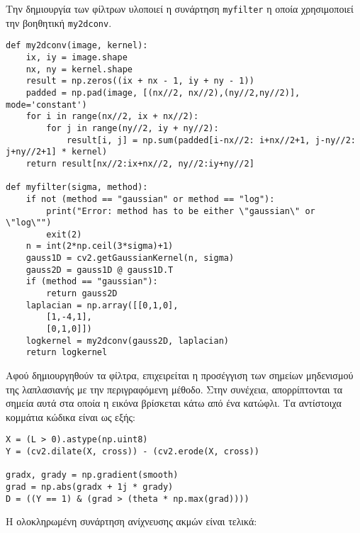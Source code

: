 \documentclass{article}
\newcommand{\eng}[1]{\foreignlanguage{english}{#1}}
\begin{document}
Την δημιουργία των φίλτρων υλοποιεί η συνάρτηση \eng{\texttt{myfilter}} η οποία χρησιμοποιεί την βοηθητική \eng{\texttt{my2dconv}}.

\begin{lstlisting}[breaklines=true, showstringspaces=false]
def my2dconv(image, kernel):
    ix, iy = image.shape
    nx, ny = kernel.shape
    result = np.zeros((ix + nx - 1, iy + ny - 1))
    padded = np.pad(image, [(nx//2, nx//2),(ny//2,ny//2)], mode='constant')
    for i in range(nx//2, ix + nx//2):
        for j in range(ny//2, iy + ny//2):
            result[i, j] = np.sum(padded[i-nx//2: i+nx//2+1, j-ny//2: j+ny//2+1] * kernel)
    return result[nx//2:ix+nx//2, ny//2:iy+ny//2]

def myfilter(sigma, method):
    if not (method == "gaussian" or method == "log"):
        print("Error: method has to be either \"gaussian\" or \"log\"")
        exit(2)
    n = int(2*np.ceil(3*sigma)+1)
    gauss1D = cv2.getGaussianKernel(n, sigma)
    gauss2D = gauss1D @ gauss1D.T
    if (method == "gaussian"):
        return gauss2D
    laplacian = np.array([[0,1,0],
        [1,-4,1],
        [0,1,0]])
    logkernel = my2dconv(gauss2D, laplacian)
    return logkernel
\end{lstlisting}

Αφού δημιουργηθούν τα φίλτρα, επιχειρείται η προσέγγιση των σημείων μηδενισμού της λαπλασιανής με την περιγραφόμενη μέθοδο. Στην συνέχεια, απορρίπτονται τα σημεία αυτά στα οποία η εικόνα βρίσκεται κάτω από ένα κατώφλι. Τα αντίστοιχα κομμάτια κώδικα είναι ως εξής:

\begin{lstlisting}[breaklines=true, showstringspaces=false]
X = (L > 0).astype(np.uint8)
Y = (cv2.dilate(X, cross)) - (cv2.erode(X, cross))

gradx, grady = np.gradient(smooth)
grad = np.abs(gradx + 1j * grady)
D = ((Y == 1) & (grad > (theta * np.max(grad))))
\end{lstlisting}

Η ολοκληρωμένη συνάρτηση ανίχνευσης ακμών είναι τελικά:
\end{document}
